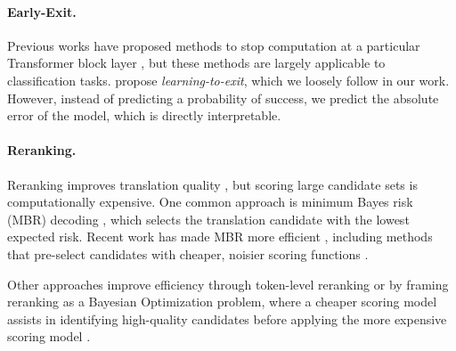 \paragraph{Early-Exit.}
Previous works have proposed methods to stop computation at a particular Transformer block layer \citep{bertpatience}, but these methods are largely applicable to classification tasks.
\citet{xin-etal-2021-berxit} propose \textit{learning-to-exit}, which we loosely follow in our work.
However, instead of predicting a probability of success, we predict the absolute error of the model, which is directly interpretable.

\paragraph{Reranking.}
Reranking improves translation quality \citep{freitag-etal-2022-high}, but scoring large candidate sets is computationally expensive. One common approach is minimum Bayes risk (MBR) decoding \citep[MBR;][]{eikema-aziz-2020-map}, which selects the translation candidate with the lowest expected risk. Recent work has made MBR more efficient \citep{cheng-vlachos-2023-faster,deguchi-etal-2024-centroid,trabelsi2024efficientminimumbayesrisk,vamvas-sennrich-2024-linear}, including methods that pre-select candidates with cheaper, noisier scoring functions \citep{fernandes-etal-2022-quality, eikema-aziz-2022-sampling}.

Other approaches improve efficiency through token-level reranking \citep{singhal-etal-2023-eel} or by framing reranking as a Bayesian Optimization problem, where a cheaper scoring model assists in identifying high-quality candidates before applying the more expensive scoring model \citep{cheng2024bayesianoptimizationapproachmachine}.